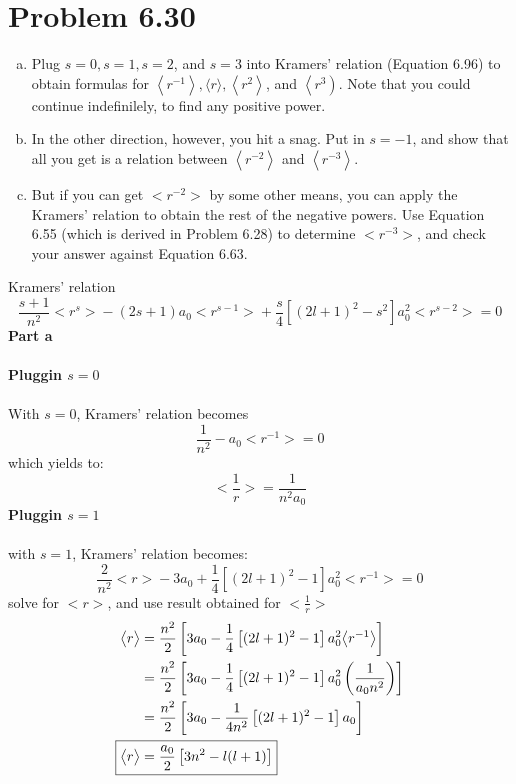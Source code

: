 \documentclass[12 pt]{article}
\numberwithin{equation}{section}
\begin{document}
\section*{Problem 6.30}
\begin{enumerate}[a)]
  \item Plug $s=0, s=1, s=2$, and $s=3$ into Kramers' relation (Equation 6.96) to obtain 
    formulas for $\left\langle r^{-1}\right\rangle,\langle r\rangle,\left\langle 
    r^2\right\rangle$, and $\left\langle r^3\right)$. Note that you could continue 
    indefinilely, to find any positive power.
  \item  In the other direction, however, you hit a snag. Put in $s=-1$, and show that all 
    you get is a relation between $\left\langle r^{-2}\right\rangle$ and $\left\langle
    r^{-3}\right\rangle$.
  \item But if you can get $\big<r^{-2}\big>$ by some other means, you can apply the Kramers' 
    relation to obtain the rest of the negative powers. Use Equation 6.55 (which is derived in 
    Problem 6.28) to determine $\big<r^{-3}\big>$, and check your answer against Equation 6.63.
\end{enumerate}
Kramers' relation 
\[
  \frac{s+1}{n^2}\big<r^s\big> - (2s+1)a_0 \big<r^{s-1}\big> + \frac{s}{4}\left[
  (2l+1)^2-s^2\right]a_0^2\big<r^{s-2}\big> = 0
\]
\textbf{Part a}\\
\\
\textbf{Pluggin $s=0$}\\
\\
With $s = 0$, Kramers' relation becomes 
\[
  \frac{1}{n^2} - a_0\big<r^{-1}\big> = 0
\]
which yields to:
\[
  \boxed{\bigg<\frac{1}{r}\bigg> = \frac{1}{n^2 a_0}}
\]
\textbf{Pluggin $s= 1$}\\
\\
with $s=1$, Kramers' relation becomes: 
\[
  \frac{2}{n^2}\big<r\big> - 3a_0 + \frac{1}{4}\left[(2l+1)^2-1\right]a_0^2\big<r^{-1}\big>=0 
\]
solve for $\big<r\big>$, and use result obtained for $\bigg<\frac{1}{r}\bigg>$
\begin{align*}
  \big<r\big> &= \frac{n^2}{2}\left[3a_0- \frac{1}{4}\left[(2l+1)^2-1\right]a_0^2\big<r^{-1}
  \big> \right]\\
  &= \frac{n^2}{2}\left[3a_0- \frac{1}{4}\left[(2l+1)^2-1\right]a_0^2
  \left(\frac{1}{a_0n^2}\right) \right]\\
  &= \frac{n^2}{2}\left[3a_0- \frac{1}{4n^2}\left[(2l+1)^2-1\right]a_0\right]\\
    \Aboxed{\big<r\big> &= \frac{a_0}{2}\left[3n^2- l(l+1)\right]}
  \end{align*}
\end{document}
